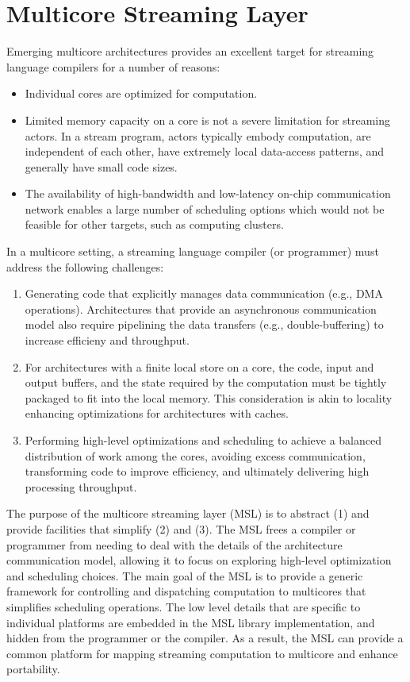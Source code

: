 \section{Multicore Streaming Layer}\label{ch:lib}

Emerging multicore architectures provides an excellent target for
streaming language compilers for a number of reasons:
\begin{itemize}
\item Individual cores are optimized for computation.
\item Limited memory capacity on a core is not a severe
limitation for streaming actors. In a stream program, actors typically
embody computation, are independent of each other, have extremely
local data-access patterns, and generally have small code sizes.
\item The availability of high-bandwidth and low-latency on-chip
communication network enables a large number of scheduling options
which would not be feasible for other targets, such as computing
clusters.
\end{itemize}

In a multicore setting, a streaming language compiler (or programmer)
must address the following challenges:
\begin{enumerate}
\item Generating code that explicitly manages data communication
  (e.g., DMA operations). Architectures that provide an asynchronous
  communication model also require pipelining the data transfers (e.g.,
  double-buffering) to increase efficieny and throughput.
\item For architectures with a finite local store on a core, the code,
  input and output buffers, and the state required by the computation
  must be tightly packaged to fit into the local memory. This
  consideration is akin to locality enhancing optimizations for
  architectures with caches.
\item Performing high-level optimizations and scheduling to achieve a
  balanced distribution of work among the cores, avoiding excess
  communication, transforming code to improve efficiency, and
  ultimately delivering high processing throughput.
\end{enumerate}

The purpose of the multicore streaming layer (MSL) is to abstract
\textsf{(1)} and provide facilities that simplify \textsf{(2)} and
\textsf{(3)}. The MSL frees a compiler or programmer from needing to
deal with the details of the architecture communication model,
allowing it to focus on exploring high-level optimization and
scheduling choices. The main goal of the MSL is to provide a generic
framework for controlling and dispatching computation to multicores
that simplifies scheduling operations. The low level details that are
specific to individual platforms are embedded in the MSL library
implementation, and hidden from the programmer or the compiler. As a
result, the MSL can provide a common platform for mapping streaming
computation to multicore and enhance portability.
